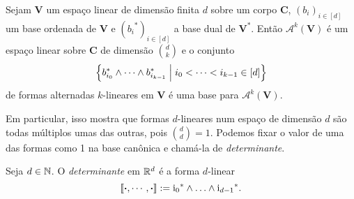 


\begin{proposition}
Sejam $\bm V$ um espaço linear de dimensão finita $d$ sobre um corpo $\bm C$, $(b_i)_{i \in [d]}$ um base ordenada de $\bm V$ e $({b_i}^*)_{i \in [d]}$ a base dual de $\bm{V^*}$. Então $\mathcal{A}^k(\bm V)$ é um espaço linear sobre $\bm C$ de dimensão $\binom{d}{k}$ e o conjunto
	\begin{equation*}
	\left\{{b_{i_0}^* \wedge \cdots \wedge b_{i_{k-1}}^*}\;\middle\vert\;{i_0 < \cdots < i_{k-1} \in [d]}\right\}
	\end{equation*}
de formas alternadas $k$-lineares em $\bm V$ é uma base para $\mathcal{A}^k(\bm V)$.
\end{proposition}

Em particular, isso mostra que formas $d$-lineares num espaço de dimensão $d$ são todas múltiplos umas das outras, pois $\binom{d}{d}=1$. Podemos fixar o valor de uma das formas como 1 na base canônica e chamá-la de \emph{determinante}.

\begin{definition}
Seja $d \in \mathbb{N}$. O \emph{determinante} em $\mathbb{R}^d$ é a forma $d$-linear
	\begin{equation*}
	\left\llbracket{\bm{\cdot},\cdots,\bm{\cdot}}\right\rrbracket := {\mathrm{i}_0}^* \wedge \ldots \wedge {\mathrm{i}_{d-1}}^*.
	\end{equation*}
\end{definition}

